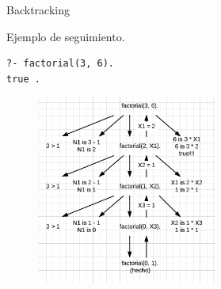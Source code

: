 \documentclass[xcolor=dvipsnames]{beamer}
\begin{document}
\begin{frame}[fragile]{Backtracking}
 
    Ejemplo de seguimiento.
    \begin{lstlisting}
?- factorial(3, 6).
true .
    \end{lstlisting}
    \begin{figure}[H]
		\centering
		\includegraphics[height=175pt]{factorial.png}
	\end{figure}	

    
\end{frame}
\end{document}
